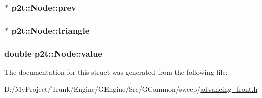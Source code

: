 \subsubsection[{prev}]{$\ast$ p2t\+::\+Node\+::prev}\label{structp2t_1_1_node_a2b0cd5c3882bb383a5180472d81cb39c}
\hypertarget{structp2t_1_1_node_a272db6142d5d20b8f5157a084cae6a5b}{}
\subsubsection[{triangle}]{$\ast$ p2t\+::\+Node\+::triangle}\label{structp2t_1_1_node_a272db6142d5d20b8f5157a084cae6a5b}
\hypertarget{structp2t_1_1_node_adcf1fe932052b232ec31204eccef031a}{}
\subsubsection[{value}]{\setlength{\rightskip}{0pt plus 5cm}double p2t\+::\+Node\+::value}\label{structp2t_1_1_node_adcf1fe932052b232ec31204eccef031a}


The documentation for this struct was generated from the following file\+:\begin{DoxyCompactItemize}
\item 
D\+:/\+My\+Project/\+Trunk/\+Engine/\+G\+Engine/\+Src/\+G\+Common/sweep/\hyperlink{advancing__front_8h}{advancing\+\_\+front.\+h}\end{DoxyCompactItemize}
